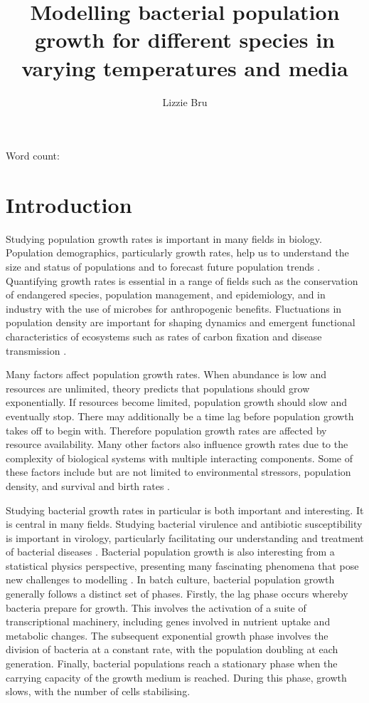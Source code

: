 \documentclass[11pt]{article}
\title{\textbf{Modelling bacterial population growth for different species in varying temperatures and media}}
\author[1]{Lizzie Bru}
\affil[1]{School of Life Sciences, Imperial College London, Silwood Park Campus, Ascot SL5 7PY, UK}
\date{}
\newcommand{\quickwordcount}[1]{
		\begin{center}
			{\large Word count:
			}
		\end{center}
}
\begin{document}
	
	\maketitle
	\quickwordcount
	
	\newpage
	
	\section{Introduction}
	
	Studying population growth rates is important in many fields in biology. Population demographics, particularly growth rates, help us to understand the size and status of populations and to forecast future population trends \cite{tarsi2012}. Quantifying growth rates is essential in a range of fields such as the conservation of endangered species, population management, and epidemiology, and in industry with the use of microbes for anthropogenic benefits. Fluctuations in population density are important for shaping dynamics and  emergent functional characteristics of ecosystems such as rates of carbon fixation and disease transmission \cite{ewald1976toxicity, gao1992disease}.
	
	Many factors affect population growth rates. When abundance is low and resources are unlimited, theory predicts that populations should grow exponentially. If resources become limited, population growth should slow and eventually stop. There may additionally be a time lag before population growth takes off to begin with. Therefore population growth rates are affected by resource availability. Many other factors also influence growth rates due to the complexity of biological systems with multiple interacting components. Some of these factors include but are not limited to environmental stressors, population density, and survival and birth rates \cite{dinsmore2010assessment, sibly2002population}.
	
	Studying bacterial growth rates in particular is both important and interesting. It is central in many fields. Studying bacterial virulence and antibiotic susceptibility is important in virology, particularly facilitating our understanding and treatment of bacterial diseases \cite{boulos2005molecular}. 
	Bacterial population growth is also interesting from a statistical physics perspective, presenting many fascinating phenomena that pose new challenges to modelling \cite{allen2018bacterial}. In batch culture, bacterial population growth generally follows a distinct set of phases. Firstly, the lag phase occurs whereby bacteria prepare for growth. This involves the activation of a suite of transcriptional machinery, including genes involved in nutrient uptake and metabolic changes. The subsequent exponential growth phase involves the division of bacteria at a constant rate, with the population doubling at each generation. Finally, bacterial populations reach a stationary phase when the carrying capacity of the growth medium is reached. During this phase, growth slows, with the number of cells stabilising.
	
\end{document}
